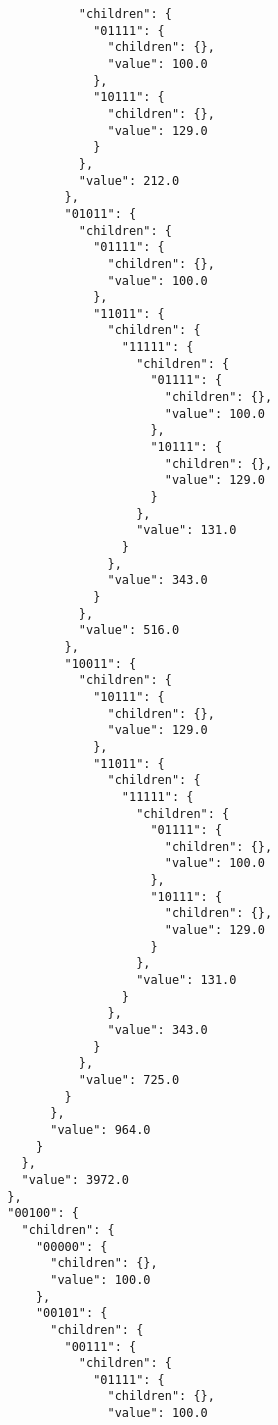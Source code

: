 \documentclass{article}
\begin{document}
\begin{listing}
\begin{verbatim}
                  "children": {
                    "01111": {
                      "children": {},
                      "value": 100.0
                    },
                    "10111": {
                      "children": {},
                      "value": 129.0
                    }
                  },
                  "value": 212.0
                },
                "01011": {
                  "children": {
                    "01111": {
                      "children": {},
                      "value": 100.0
                    },
                    "11011": {
                      "children": {
                        "11111": {
                          "children": {
                            "01111": {
                              "children": {},
                              "value": 100.0
                            },
                            "10111": {
                              "children": {},
                              "value": 129.0
                            }
                          },
                          "value": 131.0
                        }
                      },
                      "value": 343.0
                    }
                  },
                  "value": 516.0
                },
                "10011": {
                  "children": {
                    "10111": {
                      "children": {},
                      "value": 129.0
                    },
                    "11011": {
                      "children": {
                        "11111": {
                          "children": {
                            "01111": {
                              "children": {},
                              "value": 100.0
                            },
                            "10111": {
                              "children": {},
                              "value": 129.0
                            }
                          },
                          "value": 131.0
                        }
                      },
                      "value": 343.0
                    }
                  },
                  "value": 725.0
                }
              },
              "value": 964.0
            }
          },
          "value": 3972.0
        },
        "00100": {
          "children": {
            "00000": {
              "children": {},
              "value": 100.0
            },
            "00101": {
              "children": {
                "00111": {
                  "children": {
                    "01111": {
                      "children": {},
                      "value": 100.0

\end{verbatim}
\end{listing}
\end{document}
